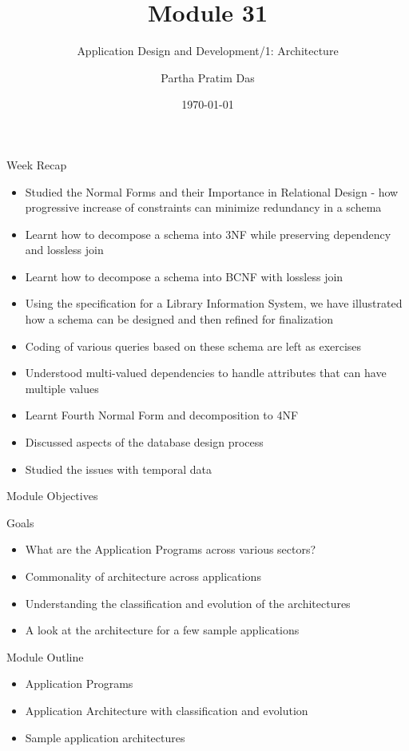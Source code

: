 \documentclass[aspectratio=169, xcolor=dvipsnames]{beamer}
\title{Module 31}
\subtitle{Application Design and Development/1: Architecture}
\author{Partha Pratim Das}
\institute{Department of Computer Science and Engineering\\Indian Institute of Technology, Kharagpur\\ppd@cse.iitkgp.ac.in}
\date{\today}
\begin{document}
\begin{frame}
    \titlepage
\end{frame}

\begin{frame}{Week Recap}
    \begin{itemize}[<+->]
        \item Studied the Normal Forms and their Importance in Relational Design - how progressive increase of constraints can minimize redundancy in a schema
        \item Learnt how to decompose a schema into 3NF while preserving dependency and lossless join
        \item Learnt how to decompose a schema into BCNF with lossless join
        \item Using the specification for a Library Information System, we have illustrated how a schema can be designed and then refined for finalization
        \item Coding of various queries based on these schema are left as exercises
        \item Understood multi-valued dependencies to handle attributes that can have multiple values
        \item Learnt Fourth Normal Form and decomposition to 4NF
        \item Discussed aspects of the database design process
        \item Studied the issues with temporal data
    \end{itemize}
\end{frame}

\begin{frame}{Module Objectives}
    \begin{block}{Goals}
        \begin{itemize}[<+->]
            \item What are the Application Programs across various sectors?
            \item Commonality of architecture across applications
            \item Understanding the classification and evolution of the architectures
            \item A look at the architecture for a few sample applications
        \end{itemize}
    \end{block}
\end{frame}

\begin{frame}{Module Outline}
    \begin{itemize}[<+->]
        \item Application Programs
        \item Application Architecture with classification and evolution
        \item Sample application architectures
    \end{itemize}
\end{frame}
\end{document}
